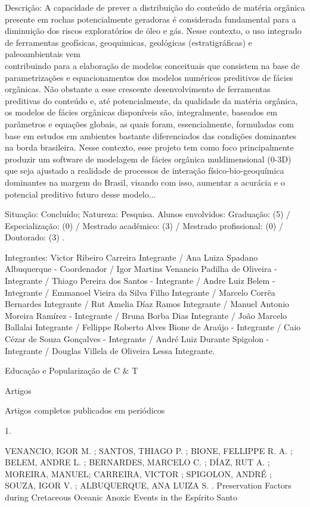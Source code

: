 \documentclass[10pt]{article}
\begin{document}
Descrição: A capacidade de prever a distribuição do conteúdo de matéria orgânica presente em rochas potencialmente geradoras é considerada fundamental para a diminuição dos riscos exploratórios de óleo e gás. Nesse contexto, o uso integrado de ferramentas geofísicas, geoquimicas, geológicas (estratigráficas) e paleoambientais vem\\
contribuindo para a elaboração de modelos conceituais que consistem na base de parametrizações e equacionamentos dos modelos numéricos preditivos de fácies orgânicas. Não obstante a esse crescente desenvolvimento de ferramentas preditivas do conteúdo e, até potencialmente, da qualidade da matéria orgânica, os modelos de fácies orgânicas disponíveis são, integralmente, baseados em parâmetros e equações globais, as quais foram, essencialmente, formuladas com base em estudos em ambientes bastante diferenciados das condições dominantes na borda brasileira. Nesse contexto, esse projeto tem como foco principalmente produzir um software de modelagem de fácies orgânica muldimensional (0-3D) que seja ajustado a realidade de processos de interação físico-bio-geoquímica dominantes na margem do Brasil, visando com isso, aumentar a acurácia e o potencial preditivo futuro desse modelo...

Situação: Concluído; Natureza: Pesquisa. Alunos envolvidos: Graduação: (5) / Especialização: (0) / Mestrado acadêmico: (3) / Mestrado profissional: (0) / Doutorado: (3) .

Integrantes: Victor Ribeiro Carreira Integrante / Ana Luiza Spadano Albuquerque - Coordenador / Igor Martins Venancio Padilha de Oliveira - Integrante / Thiago Pereira dos Santos - Integrante / Andre Luiz Belem - Integrante / Emmanoel Vieira da Silva Filho Integrante / Marcelo Corrêa Bernardes Integrante / Rut Amelia Díaz Ramos Integrante / Manuel Antonio Moreira Ramírez - Integrante / Bruna Borba Dias Integrante / João Marcelo Ballalai Integrante / Fellippe Roberto Alves Bione de Araújo - Integrante / Caio Cézar de Souza Gonçalves - Integrante / André Luiz Durante Spigolon - Integrante / Douglas Villela de Oliveira Lessa Integrante.

Educação e Popularização de C \& T

Artigos

Artigos completos publicados em periódicos

1.

VENANCIO, IGOR M. ; SANTOS, THIAGO P. ; BIONE, FELLIPPE R. A. ; BELEM, ANDRE L. ; BERNARDES, MARCELO C. ; DÍAZ, RUT A. ; MOREIRA, MANUEL; CARREIRA, VICTOR ; SPIGOLON, ANDRÉ ; SOUZA, IGOR V. ; ALBUQUERQUE, ANA LUIZA S. . Preservation Factors during Cretaceous Oceanic Anoxic Events in the Espírito Santo
\end{document}
